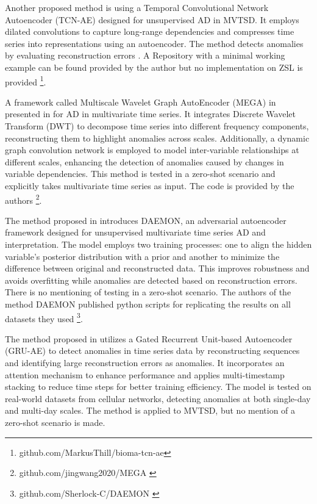 Another proposed method is using a Temporal Convolutional Network Autoencoder (TCN-AE) designed for unsupervised AD in MVTSD. It employs dilated convolutions to capture long-range dependencies and compresses time series into representations using an autoencoder. The method detects anomalies by evaluating reconstruction errors \cite{thill_temporal_2021}. A Repository with a minimal working example can be found provided by the author but no implementation on ZSL is provided \footnote{\fussy\tiny github.com/MarkusThill/bioma-tcn-ae}.

A framework called Multiscale Wavelet Graph AutoEncoder (MEGA) in presented in \cite{wang_multiscale_2023} for AD in multivariate time series. It integrates Discrete Wavelet Transform (DWT) to decompose time series into different frequency components, reconstructing them to highlight anomalies across scales. Additionally, a dynamic graph convolution network is employed to model inter-variable relationships at different scales, enhancing the detection of anomalies caused by changes in variable dependencies.
This method is tested in a zero-shot scenario and explicitly takes multivariate time series as input. The code is provided by the authors \footnote{\fussy\tiny github.com/jingwang2020/MEGA \label{foot_mega}}.

The method proposed in \cite{chen_adversarial_2023} introduces DAEMON, an adversarial autoencoder framework designed for unsupervised multivariate time series AD and interpretation. The model employs two training processes: one to align the hidden variable’s posterior distribution with a prior and another to minimize the difference between original and reconstructed data. This improves robustness and avoids overfitting while anomalies are detected based on reconstruction errors. There is no mentioning of testing in a zero-shot scenario.
The authors of the method DAEMON published python scripts for replicating the results on all datasets they used \footnote{\fussy\tiny github.com/Sherlock-C/DAEMON \label{foot_daemon}}.

The method proposed in \cite{gong_autoencoder-based_2022} utilizes a Gated Recurrent Unit-based Autoencoder (GRU-AE) to detect anomalies in time series data by reconstructing sequences and identifying large reconstruction errors as anomalies. It incorporates an attention mechanism to enhance performance and applies multi-timestamp stacking to reduce time steps for better training efficiency. The model is tested on real-world datasets from cellular networks, detecting anomalies at both single-day and multi-day scales. The method is applied to MVTSD, but no mention of a zero-shot scenario is made.

